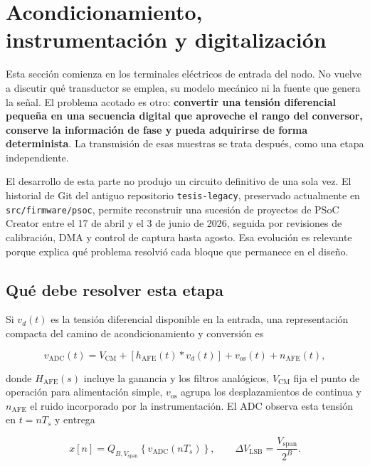 \section{Acondicionamiento, instrumentaci\'on y digitalizaci\'on}
\label{sec:acondicionamiento-digitalizacion}

Esta secci\'on comienza en los terminales el\'ectricos de entrada del nodo. No vuelve a
discutir qu\'e transductor se emplea, su modelo mec\'anico ni la fuente que genera la
se\~nal. El problema acotado es otro: \textbf{convertir una tensi\'on diferencial peque\~na
en una secuencia digital que aproveche el rango del conversor, conserve la informaci\'on
de fase y pueda adquirirse de forma determinista}. La transmisi\'on de esas muestras se
trata despu\'es, como una etapa independiente.

El desarrollo de esta parte no produjo un circuito definitivo de una sola vez. El
historial de Git del antiguo repositorio \texttt{tesis-legacy}, preservado actualmente en
\texttt{src/firmware/psoc}, permite reconstruir una sucesi\'on de proyectos de PSoC
Creator entre el 17 de abril y el 3 de junio de 2026, seguida por revisiones de
calibraci\'on, DMA y control de captura hasta agosto. Esa evoluci\'on es relevante porque
explica qu\'e problema resolvi\'o cada bloque que permanece en el dise\~no.

\subsection{Qu\'e debe resolver esta etapa}

Si $v_d(t)$ es la tensi\'on diferencial disponible en la entrada, una representaci\'on
compacta del camino de acondicionamiento y conversi\'on es

\begin{equation}
v_{\mathrm{ADC}}(t)=V_{\mathrm{CM}}+
\left[h_{\mathrm{AFE}}(t)*v_d(t)\right]+v_{\mathrm{os}}(t)+n_{\mathrm{AFE}}(t),
\label{eq:afe-general}
\end{equation}

donde $H_{\mathrm{AFE}}(s)$ incluye la ganancia y los filtros anal\'ogicos,
$V_{\mathrm{CM}}$ fija el punto de operaci\'on para alimentaci\'on simple,
$v_{\mathrm{os}}$ agrupa los desplazamientos de continua y $n_{\mathrm{AFE}}$ el ruido
incorporado por la instrumentaci\'on. El ADC observa esta tensi\'on en $t=nT_s$ y entrega

\begin{equation}
x[n]=Q_{B,V_{\mathrm{span}}}\!\left\{v_{\mathrm{ADC}}(nT_s)\right\},
\qquad
\Delta V_{\mathrm{LSB}}=\frac{V_{\mathrm{span}}}{2^B}.
\label{eq:adc-cuantizacion}
\end{equation}

